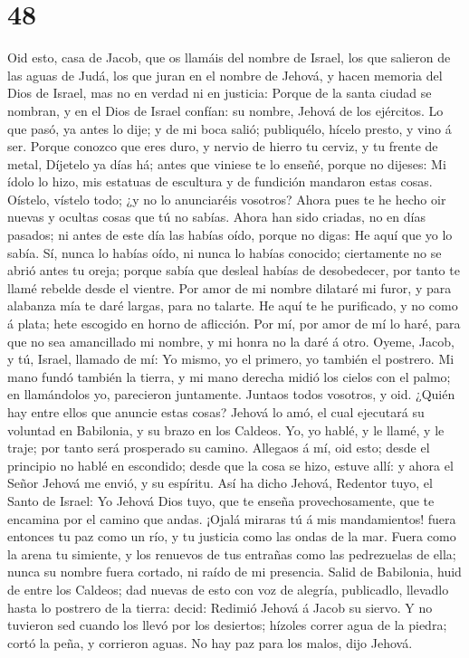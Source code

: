 \hypertarget{section-47}{%
\section{48}\label{section-47}}

 Oid esto, casa de Jacob, que os llamáis del nombre de
Israel, los que salieron de las aguas de Judá, los que juran en el
nombre de Jehová, y hacen memoria del Dios de Israel, mas no en verdad
ni en justicia:  Porque de la santa ciudad se nombran, y en
el Dios de Israel confían: su nombre, Jehová de los ejércitos.
 Lo que pasó, ya antes lo dije; y de mi boca salió;
publiquélo, hícelo presto, y vino á ser.  Porque conozco que
eres duro, y nervio de hierro tu cerviz, y tu frente de metal,
 Díjetelo ya días há; antes que viniese te lo enseñé, porque
no dijeses: Mi ídolo lo hizo, mis estatuas de escultura y de fundición
mandaron estas cosas.  Oístelo, vístelo todo; ¿y no lo
anunciaréis vosotros? Ahora pues te he hecho oir nuevas y ocultas cosas
que tú no sabías.  Ahora han sido criadas, no en días
pasados; ni antes de este día las habías oído, porque no digas: He aquí
que yo lo sabía.  Sí, nunca lo habías oído, ni nunca lo
habías conocido; ciertamente no se abrió antes tu oreja; porque sabía
que desleal habías de desobedecer, por tanto te llamé rebelde desde el
vientre.  Por amor de mi nombre dilataré mi furor, y para
alabanza mía te daré largas, para no talarte.  He aquí te
he purificado, y no como á plata; hete escogido en horno de aflicción.
 Por mí, por amor de mí lo haré, para que no sea
amancillado mi nombre, y mi honra no la daré á otro. 
Oyeme, Jacob, y tú, Israel, llamado de mí: Yo mismo, yo el primero, yo
también el postrero.  Mi mano fundó también la tierra, y mi
mano derecha midió los cielos con el palmo; en llamándolos yo,
parecieron juntamente.  Juntaos todos vosotros, y oid.
¿Quién hay entre ellos que anuncie estas cosas? Jehová lo amó, el cual
ejecutará su voluntad en Babilonia, y su brazo en los Caldeos.
 Yo, yo hablé, y le llamé, y le traje; por tanto será
prosperado su camino.  Allegaos á mí, oid esto; desde el
principio no hablé en escondido; desde que la cosa se hizo, estuve allí:
y ahora el Señor Jehová me envió, y su espíritu.  Así ha
dicho Jehová, Redentor tuyo, el Santo de Israel: Yo Jehová Dios tuyo,
que te enseña provechosamente, que te encamina por el camino que andas.
 ¡Ojalá miraras tú á mis mandamientos! fuera entonces tu
paz como un río, y tu justicia como las ondas de la mar. 
Fuera como la arena tu simiente, y los renuevos de tus entrañas como las
pedrezuelas de ella; nunca su nombre fuera cortado, ni raído de mi
presencia.  Salid de Babilonia, huid de entre los Caldeos;
dad nuevas de esto con voz de alegría, publicadlo, llevadlo hasta lo
postrero de la tierra: decid: Redimió Jehová á Jacob su siervo.
 Y no tuvieron sed cuando los llevó por los desiertos;
hízoles correr agua de la piedra; cortó la peña, y corrieron aguas.
 No hay paz para los malos, dijo Jehová.

